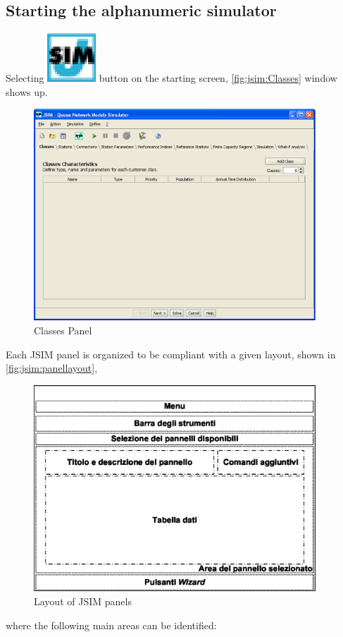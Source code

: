 \subsection{Starting the alphanumeric simulator}
Selecting \includegraphics[scale=.5]{img/JSIMIcon} button on the
starting screen, \autoref{fig:jsim:Classes} window shows up.
\begin{figure}[htb]
    \begin{center}
        \includegraphics[width=300pt]{img/jsim/classes}
    \end{center}
    \caption{Classes Panel}
    \label{fig:jsim:Classes}
\end{figure}
Each JSIM panel is organized to be compliant with a given layout, shown in \autoref{fig:jsim:panellayout}, 
\begin{figure}[tb]
    \begin{center}
        \includegraphics[width=300pt]{img/jsim/panelLayout}
    \end{center}
    \caption{Layout of JSIM panels}
    \label{fig:jsim:panellayout}
\end{figure}
where the following main areas can be identified:


